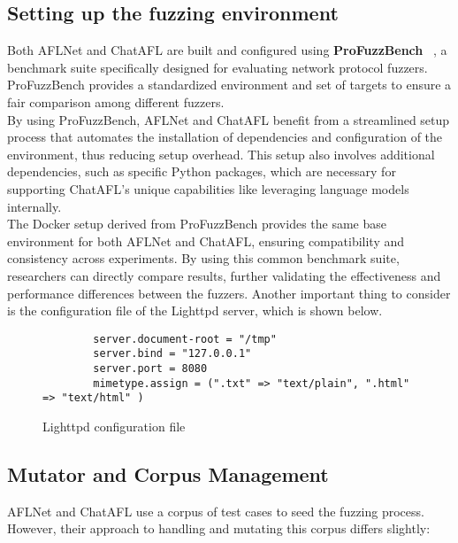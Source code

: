 \subsection{Setting up the fuzzing environment}

Both AFLNet and ChatAFL are built and configured using \textbf{ProFuzzBench} ~\cite{profuzzbench}, a benchmark suite specifically designed for evaluating network protocol fuzzers. ProFuzzBench provides a standardized environment and set of targets to ensure a fair comparison among different fuzzers.
\\By using ProFuzzBench, AFLNet and ChatAFL benefit from a streamlined setup process that automates the installation of dependencies and configuration of the environment, thus reducing setup overhead. This setup also involves additional dependencies, such as specific Python packages, which are necessary for supporting ChatAFL's unique capabilities like leveraging language models internally.
\\The Docker setup derived from ProFuzzBench provides the same base environment for both AFLNet and ChatAFL, ensuring compatibility and consistency across experiments. By using this common benchmark suite, researchers can directly compare results, further validating the effectiveness and performance differences between the fuzzers.
Another important thing to consider is the configuration file of the Lighttpd server, which is shown below.\\
\begin{figure}[H]
    \begin{lstlisting}
        server.document-root = "/tmp"
        server.bind = "127.0.0.1"
        server.port = 8080
        mimetype.assign = (".txt" => "text/plain", ".html" => "text/html" )
    \end{lstlisting}
    \caption{Lighttpd configuration file}
    \label{fig:lighttpd_conf_aflnetchatafl}
\end{figure}

\subsection{Mutator and Corpus Management}

AFLNet and ChatAFL use a corpus of test cases to seed the fuzzing process. However, their approach to handling and mutating this corpus differs slightly:

